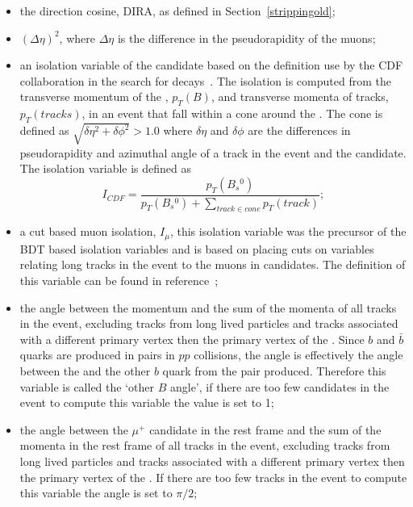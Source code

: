 \begin{itemize}
\item the direction cosine, DIRA, as defined in Section~\ref{strippingold};
\item $(\Delta \eta)^{2}$, where $\Delta \eta$ is the difference in the pseudorapidity of the muons;
\item an isolation variable of the \bs candidate based on the definition use by the CDF collaboration in the search for \bmumu decays~\cite{Abulencia:2005pw}. The isolation is computed from the transverse momentum of the \bs, $p_{T}(B)$, and transverse momenta of tracks, $p_{T}(tracks)$, in an event that fall within a cone around the \bs. The cone is defined as $\sqrt{\delta \eta^{2} + \delta \phi^{2}} > 1.0$ where $\delta \eta$ and $\delta \phi$ are the differences in pseudorapidity and azimuthal angle of a track in the event and the \bs candidate. The isolation variable is defined as 
\begin{equation}
I_{CDF} = \frac{p_{T}(B_{s}{^0})}{p_{T}(B_{s}{^0}) + \displaystyle\sum_{track \in cone}p_{T}(track) };
\end{equation}
\item a cut based muon isolation, $I_{\mu}$, this isolation variable was the precursor of the BDT based isolation variables and is based on placing cuts on variables relating long tracks in the event to the muons in \bsmumu candidates. The definition of this variable can be found in reference~\cite{Morda:2120795};
\item the angle between the \bs momentum and the sum of the momenta of all tracks in the event, excluding tracks from long lived particles and tracks associated with a different primary vertex then the primary vertex of the \bs. Since $b$ and $\bar{b}$ quarks are produced in pairs in $pp$ collisions, the angle is effectively the angle between the \bs and the other $b$ quark from the pair produced. Therefore this variable is called the `other $B$ angle', if there are too few candidates in the event to compute this variable the value is set to 1; %
\item the angle between the $\mu^+$ candidate in the \bs rest frame and the sum of the momenta in the \bs rest frame of all tracks in the event, excluding tracks from long lived particles and tracks associated with a different primary vertex then the primary vertex of the \bs. If there are too few tracks in the event to compute this variable the angle is set to $\pi/2$;%

\end{itemize}
